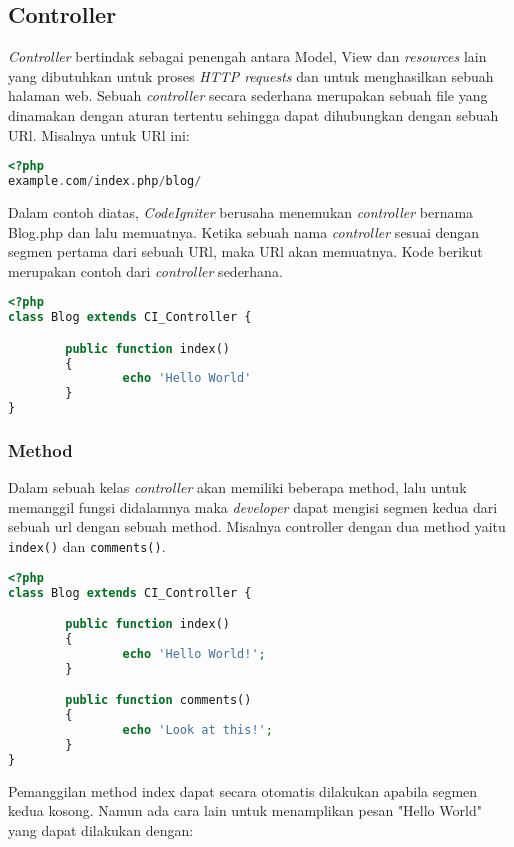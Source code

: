 \subsection{Controller}
\textit{Controller} bertindak sebagai penengah antara Model, View dan \textit{resources} lain yang dibutuhkan untuk proses \textit{HTTP requests} dan untuk menghasilkan sebuah halaman web. Sebuah \textit{controller} secara sederhana merupakan sebuah file yang dinamakan dengan aturan tertentu sehingga dapat dihubungkan dengan sebuah URl.
Misalnya untuk URl ini:
\begin{lstlisting}[frame=single, language=PHP] 
<?php
example.com/index.php/blog/
\end{lstlisting}

Dalam contoh diatas, \textit{CodeIgniter} berusaha menemukan \textit{controller} bernama Blog.php dan lalu memuatnya. Ketika sebuah nama \textit{controller} sesuai dengan segmen pertama dari sebuah URl, maka URl akan memuatnya. Kode berikut merupakan contoh dari \textit{controller} sederhana.
\begin{lstlisting}[frame=single, language=PHP] 
<?php
class Blog extends CI_Controller {

        public function index()
        {
                echo 'Hello World'
        }
}
\end{lstlisting} 

\subsubsection{Method}
Dalam sebuah kelas \textit{controller} akan memiliki beberapa method, lalu untuk memanggil fungsi didalamnya maka \textit{developer} dapat mengisi segmen kedua dari sebuah url dengan sebuah method. Misalnya controller dengan dua method yaitu \texttt{index()} dan \texttt{comments()}.
\begin{lstlisting}[frame=single, language=PHP] 
<?php
class Blog extends CI_Controller {

        public function index()
        {
                echo 'Hello World!';
        }

        public function comments()
        {
                echo 'Look at this!';
        }
}
\end{lstlisting}

\noindent Pemanggilan method index dapat secara otomatis dilakukan apabila segmen kedua kosong. Namun ada cara lain untuk menamplikan pesan "Hello World" yang dapat dilakukan dengan:

